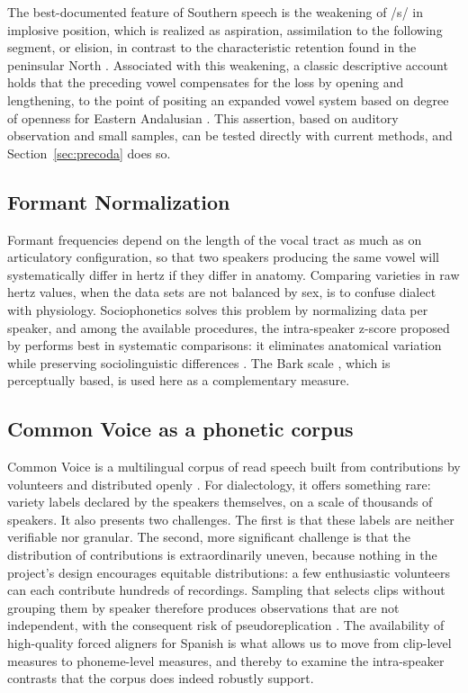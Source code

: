 \documentclass[11pt]{article}
\begin{document}
The best-documented feature of Southern speech is the weakening of /s/ in
implosive position, which is realized as aspiration, assimilation to the
following segment, or elision, in contrast to the characteristic retention found
in the peninsular North
\citep{alvar1996,narbona1998,gerfen2002,ruch2014}. Associated with this
weakening, a classic descriptive account holds that the preceding vowel
compensates for the loss by opening and lengthening, to the point of positing an
expanded vowel system based on degree of openness for Eastern Andalusian
\citep{alonso1950}. This assertion, based on auditory observation and small
samples, can be tested directly with current methods, and
Section~\ref{sec:precoda} does so.

\subsection{Formant Normalization}
\label{sec:norm}

Formant frequencies depend on the length of the vocal tract as much as on
articulatory configuration, so that two speakers producing the same vowel will
systematically differ in hertz if they differ in anatomy. Comparing varieties in
raw hertz values, when the data sets are not balanced by sex, is to confuse
dialect with physiology. Sociophonetics solves this problem by normalizing data
per speaker, and among the available procedures, the intra-speaker z-score
proposed by \citet{lobanov1971} performs best in systematic comparisons: it
eliminates anatomical variation while preserving sociolinguistic differences
\citep{adank2004}. The Bark scale \citep{traunmuller1990}, which is perceptually
based, is used here as a complementary measure.

\subsection{Common Voice as a phonetic corpus}
\label{sec:corpus}

Common Voice is a multilingual corpus of read speech built from contributions by
volunteers and distributed openly \citep{ardila2020}. For dialectology, it offers
something rare: variety labels declared by the speakers themselves, on a scale of
thousands of speakers. It also presents two challenges. The first is that these
labels are neither verifiable nor granular. The second, more significant
challenge is that the distribution of contributions is extraordinarily uneven,
because nothing in the project's design encourages equitable distributions: a few
enthusiastic volunteers can each contribute hundreds of recordings. Sampling that
selects clips without grouping them by speaker therefore produces observations
that are not independent, with the consequent risk of pseudoreplication
\citep{hurlbert1984,winter2019}. The availability of high-quality forced aligners
for Spanish \citep{mcauliffe2017} is what allows us to move from clip-level
measures to phoneme-level measures, and thereby to examine the intra-speaker
contrasts that the corpus does indeed robustly support.
\end{document}
